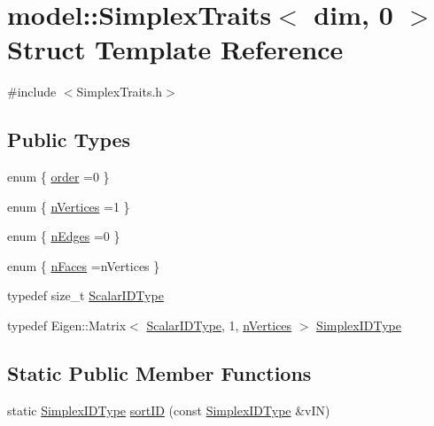\hypertarget{structmodel_1_1_simplex_traits_3_01dim_00_010_01_4}{}\section{model\+:\+:Simplex\+Traits$<$ dim, 0 $>$ Struct Template Reference}
\label{structmodel_1_1_simplex_traits_3_01dim_00_010_01_4}


{\ttfamily \#include $<$Simplex\+Traits.\+h$>$}

\subsection*{Public Types}
\begin{DoxyCompactItemize}
\item 
enum \{ \hyperlink{structmodel_1_1_simplex_traits_3_01dim_00_010_01_4_acf8912d407692db675da1b9eefc55697a9914fa5c98f878299f3486b3011655d8}{order} =0
 \}
\item 
enum \{ \hyperlink{structmodel_1_1_simplex_traits_3_01dim_00_010_01_4_a5a3c4c1de294e0c42a71ec6c72fdff57ad415b0b397cc294e1d29fd2d09b6b820}{n\+Vertices} =1
 \}
\item 
enum \{ \hyperlink{structmodel_1_1_simplex_traits_3_01dim_00_010_01_4_a22d8202441ae590faca7856d761bba8daf29e698e3f84e88369d1b363ee22563d}{n\+Edges} =0
 \}
\item 
enum \{ \hyperlink{structmodel_1_1_simplex_traits_3_01dim_00_010_01_4_abc078d09bcbf373c5c4766d56cecc44ba7e3abf414c95527b9c96b49452e2b4d8}{n\+Faces} =n\+Vertices
 \}
\item 
typedef size\+\_\+t \hyperlink{structmodel_1_1_simplex_traits_3_01dim_00_010_01_4_a19c8cef56a03cfffe86e210f5f8faae5}{Scalar\+I\+D\+Type}
\item 
typedef Eigen\+::\+Matrix$<$ \hyperlink{structmodel_1_1_simplex_traits_3_01dim_00_010_01_4_a19c8cef56a03cfffe86e210f5f8faae5}{Scalar\+I\+D\+Type}, 1, \hyperlink{structmodel_1_1_simplex_traits_3_01dim_00_010_01_4_a5a3c4c1de294e0c42a71ec6c72fdff57ad415b0b397cc294e1d29fd2d09b6b820}{n\+Vertices} $>$ \hyperlink{structmodel_1_1_simplex_traits_3_01dim_00_010_01_4_a09552e4c13ca04976647b467a63190f0}{Simplex\+I\+D\+Type}
\end{DoxyCompactItemize}
\subsection*{Static Public Member Functions}
\begin{DoxyCompactItemize}
\item 
static \hyperlink{structmodel_1_1_simplex_traits_3_01dim_00_010_01_4_a09552e4c13ca04976647b467a63190f0}{Simplex\+I\+D\+Type} \hyperlink{structmodel_1_1_simplex_traits_3_01dim_00_010_01_4_af0ca0897225b39fa677c0e374301a680}{sort\+I\+D} (const \hyperlink{structmodel_1_1_simplex_traits_3_01dim_00_010_01_4_a09552e4c13ca04976647b467a63190f0}{Simplex\+I\+D\+Type} \&v\+I\+N)
\end{DoxyCompactItemize}


